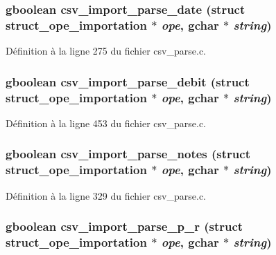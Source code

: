 \subsubsection[{csv\_\-import\_\-parse\_\-date}]{\setlength{\rightskip}{0pt plus 5cm}gboolean csv\_\-import\_\-parse\_\-date (struct {\bf struct\_\-ope\_\-importation} $\ast$ {\em ope}, \/  gchar $\ast$ {\em string})}\label{csv__parse_8c_a7cf1fb8d457bdfe6e7ded1ffcc5a5199}


Définition à la ligne 275 du fichier csv\_\-parse.c.

\subsubsection[{csv\_\-import\_\-parse\_\-debit}]{\setlength{\rightskip}{0pt plus 5cm}gboolean csv\_\-import\_\-parse\_\-debit (struct {\bf struct\_\-ope\_\-importation} $\ast$ {\em ope}, \/  gchar $\ast$ {\em string})}\label{csv__parse_8c_afad542277f2863ffd51c7e707e81afdd}


Définition à la ligne 453 du fichier csv\_\-parse.c.

\subsubsection[{csv\_\-import\_\-parse\_\-notes}]{\setlength{\rightskip}{0pt plus 5cm}gboolean csv\_\-import\_\-parse\_\-notes (struct {\bf struct\_\-ope\_\-importation} $\ast$ {\em ope}, \/  gchar $\ast$ {\em string})}\label{csv__parse_8c_a6f3afec032c7b2d6e40b54a56ad27900}


Définition à la ligne 329 du fichier csv\_\-parse.c.

\subsubsection[{csv\_\-import\_\-parse\_\-p\_\-r}]{\setlength{\rightskip}{0pt plus 5cm}gboolean csv\_\-import\_\-parse\_\-p\_\-r (struct {\bf struct\_\-ope\_\-importation} $\ast$ {\em ope}, \/  gchar $\ast$ {\em string})}\label{csv__parse_8c_a15f1fd853709db13bd92f685bed703ac}


